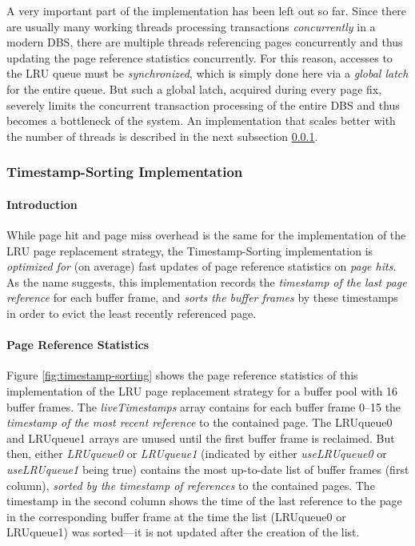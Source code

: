     A very important part of the implementation has been left out so far. Since there are usually many working threads processing transactions \emph{concurrently} in a modern DBS, there are multiple threads referencing pages concurrently and thus updating the page reference statistics concurrently. For this reason, accesses to the LRU queue must be \emph{synchronized}, which is simply done here via a \emph{global latch} for the entire queue. But such a global latch, acquired during every page fix, severely limits the concurrent transaction processing of the entire DBS and thus becomes a bottleneck of the system. An implementation that scales better with the number of threads is described in the next subsection \ref{subsubsec:lru_timestamp}.

\subsubsection[Timestamp-Sorting]{Timestamp-Sorting Implementation} \label{subsubsec:lru_timestamp}

\paragraph{Introduction}

    While page hit and page miss overhead is the same for the  implementation of the LRU page replacement strategy, the Timestamp-Sorting implementation is \emph{optimized for} (on average) fast updates of page reference statistics on \emph{page hits}. As the name suggests, this implementation records the \emph{timestamp of the last page reference} for each buffer frame, and \emph{sorts the buffer frames} by these timestamps in order to evict the least recently referenced page.

\paragraph{Page Reference Statistics}

    Figure \ref{fig:timestamp-sorting} shows the page reference statistics of this implementation of the LRU page replacement strategy for a buffer pool with \num{16} buffer frames. The \emph{liveTimestamps} array contains for each buffer frame \numrange{0}{15} the \emph{timestamp of the most recent reference} to the contained page. The LRUqueue0 and LRUqueue1 arrays are unused until the first buffer frame is reclaimed. But then, either \emph{LRUqueue0} or \emph{LRUqueue1} (indicated by either \emph{useLRUqueue0} or \emph{useLRUqueue1} being true) contains the most up-to-date list of buffer frames (first column), \emph{sorted by the timestamp of references} to the contained pages. The timestamp in the second column shows the time of the last reference to the page in the corresponding buffer frame at the time the list (LRUqueue0 or LRUqueue1) was sorted---it is not updated after the creation of the list.

